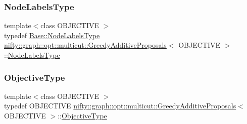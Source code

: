 \subsubsection{\texorpdfstring{Node\+Labels\+Type}{NodeLabelsType}}
{\footnotesize\ttfamily template$<$class O\+B\+J\+E\+C\+T\+I\+VE $>$ \\
typedef \hyperlink{classnifty_1_1graph_1_1opt_1_1common_1_1SolverBase_abefd51561de2fd009f6bed6bef6009ea}{Base\+::\+Node\+Labels\+Type} \hyperlink{classnifty_1_1graph_1_1opt_1_1multicut_1_1GreedyAdditiveProposals}{nifty\+::graph\+::opt\+::multicut\+::\+Greedy\+Additive\+Proposals}$<$ O\+B\+J\+E\+C\+T\+I\+VE $>$\+::\hyperlink{classnifty_1_1graph_1_1opt_1_1multicut_1_1GreedyAdditiveProposals_a4097016ca99d6d2aab8f3a8a9432f001}{Node\+Labels\+Type}}

\mbox{\label{classnifty_1_1graph_1_1opt_1_1multicut_1_1GreedyAdditiveProposals_a8b28464e490d224a3626680692ac2170}} 
\subsubsection{\texorpdfstring{Objective\+Type}{ObjectiveType}}
{\footnotesize\ttfamily template$<$class O\+B\+J\+E\+C\+T\+I\+VE $>$ \\
typedef O\+B\+J\+E\+C\+T\+I\+VE \hyperlink{classnifty_1_1graph_1_1opt_1_1multicut_1_1GreedyAdditiveProposals}{nifty\+::graph\+::opt\+::multicut\+::\+Greedy\+Additive\+Proposals}$<$ O\+B\+J\+E\+C\+T\+I\+VE $>$\+::\hyperlink{classnifty_1_1graph_1_1opt_1_1multicut_1_1GreedyAdditiveProposals_a8b28464e490d224a3626680692ac2170}{Objective\+Type}}

\mbox{\label{classnifty_1_1graph_1_1opt_1_1multicut_1_1GreedyAdditiveProposals_a436b21c4ce1d95f27c50cf7aa9b41b1f}} 
